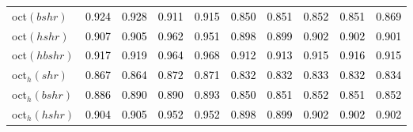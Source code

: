 \begin{tabular}[t]{l|ccccccccc}
oct$(bshr)$ & \textcolor{black}{0.924} & \textcolor{black}{0.928} & \textcolor{black}{0.911} & \textcolor{black}{0.915} & \textcolor{black}{0.850} & \textcolor{black}{0.851} & \textcolor{black}{0.852} & \textcolor{black}{0.851} & \textcolor{black}{0.869}\\
oct$(hshr)$ & \textcolor{black}{0.907} & \textcolor{black}{0.905} & \textcolor{black}{0.962} & \textcolor{black}{0.951} & \textcolor{black}{0.898} & \textcolor{black}{0.899} & \textcolor{black}{0.902} & \textcolor{black}{0.902} & \textcolor{black}{0.901}\\
oct$(hbshr)$ & \textcolor{black}{0.917} & \textcolor{black}{0.919} & \textcolor{black}{0.964} & \textcolor{black}{0.968} & \textcolor{black}{0.912} & \textcolor{black}{0.913} & \textcolor{black}{0.915} & \textcolor{black}{0.916} & \textcolor{black}{0.915}\\
oct$_h(shr)$ & \textcolor{black}{0.867} & \textcolor{black}{0.864} & \textcolor{black}{0.872} & \textcolor{black}{0.871} & \textcolor{black}{0.832} & \textcolor{black}{0.832} & \textcolor{black}{0.833} & \textcolor{black}{0.832} & \textcolor{black}{0.834}\\
oct$_h(bshr)$ & \textcolor{black}{0.886} & \textcolor{black}{0.890} & \textcolor{black}{0.890} & \textcolor{black}{0.893} & \textcolor{black}{0.850} & \textcolor{black}{0.851} & \textcolor{black}{0.852} & \textcolor{black}{0.851} & \textcolor{black}{0.852}\\
oct$_h(hshr)$ & \textcolor{black}{0.904} & \textcolor{black}{0.905} & \textcolor{black}{0.952} & \textcolor{black}{0.952} & \textcolor{black}{0.898} & \textcolor{black}{0.899} & \textcolor{black}{0.902} & \textcolor{black}{0.902} & \textcolor{black}{0.902}\\
\bottomrule
\end{tabular}
